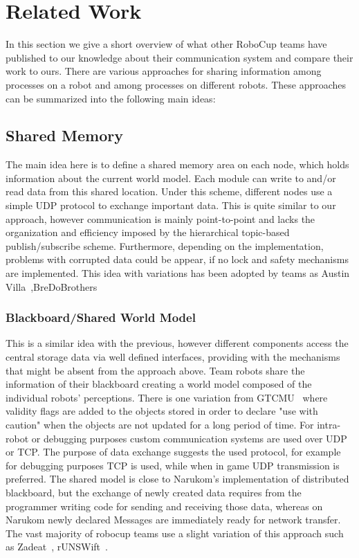 \chapter{Related Work}
\label{related}
In this section we give a short overview of what other RoboCup teams have published to our knowledge about their
communication system  and compare their work to ours. There are various approaches for sharing information among
processes on a robot and among processes on different robots. These approaches can be summarized into the following main ideas:
\section{Shared Memory}
The main idea here is to define a shared memory area on each node, which holds information about the current world model. Each module can write to and/or read data from this shared location. Under this scheme, different nodes use a simple UDP protocol to exchange important data. This is quite similar to our
approach, however communication is mainly point-to-point and lacks the organization and efficiency imposed by the hierarchical topic-based publish/subscribe scheme. Furthermore, depending on the implementation, problems with corrupted data could be appear, if no lock and safety mechanisms are implemented. This idea with variations has been adopted by teams as Austin Villa~\cite{Austin-Villa},BreDoBrothers~\cite{BreDoBrothers}
\subsection{Blackboard/Shared World Model}
This is a similar idea with the previous, however different components access the central storage data via well defined interfaces, providing with the mechanisms that might be absent from the approach above. Team robots share the information of their blackboard creating a world model composed of the individual robots' perceptions.  There is one variation from GTCMU~\cite{GTCMU} where validity flags are added to the objects stored in order to declare "use with caution" when the objects are not updated for a long period of time. For intra-robot or debugging purposes custom communication systems are used over UDP or TCP.  The purpose of data exchange suggests the used protocol, for example for debugging purposes TCP is used, while when in game UDP transmission is preferred. The shared model is close to Narukom's implementation of distributed blackboard, but the exchange of newly created data requires from the programmer writing code for sending and receiving those data, whereas on Narukom newly declared Messages are immediately ready for network transfer. The vast majority of robocup teams use a slight variation of this approach such as Zadeat~\cite{Zadeat}, rUNSWift~\cite{rUNSWift}.
